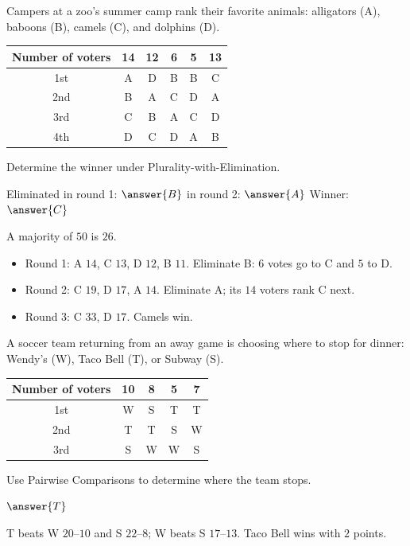 \documentclass[12pt]{ximera}
\begin{document}
\begin{problem}
Campers at a zoo's summer camp rank their favorite animals: alligators (A), baboons (B),
camels (C), and dolphins (D).
\begin{center}
\begin{tabular}{c|ccccc}
Number of voters & 14 & 12 & 6 & 5 & 13\\\hline
1st & A & D & B & B & C\\
2nd & B & A & C & D & A\\
3rd & C & B & A & C & D\\
4th & D & C & D & A & B
\end{tabular}
\end{center}
Determine the winner under Plurality-with-Elimination.

Eliminated in round 1: $\answer{B}$ \quad in round 2: $\answer{A}$ \qquad Winner:
$\answer{C}$

\begin{feedback}
A majority of $50$ is $26$.
\begin{itemize}
\item Round 1: A $14$, C $13$, D $12$, B $11$. Eliminate B: $6$ votes go to C and $5$
      to D.
\item Round 2: C $19$, D $17$, A $14$. Eliminate A; its $14$ voters rank C next.
\item Round 3: C $33$, D $17$. Camels win.
\end{itemize}
\end{feedback}
\end{problem}

\begin{problem}
A soccer team returning from an away game is choosing where to stop for dinner: Wendy's
(W), Taco Bell (T), or Subway (S).
\begin{center}
\begin{tabular}{c|cccc}
Number of voters & 10 & 8 & 5 & 7\\\hline
1st & W & S & T & T\\
2nd & T & T & S & W\\
3rd & S & W & W & S
\end{tabular}
\end{center}
Use Pairwise Comparisons to determine where the team stops.

$\answer{T}$

\begin{feedback}
T beats W $20$--$10$ and S $22$--$8$; W beats S $17$--$13$. Taco Bell wins with $2$
points.
\end{feedback}
\end{problem}
\end{document}
